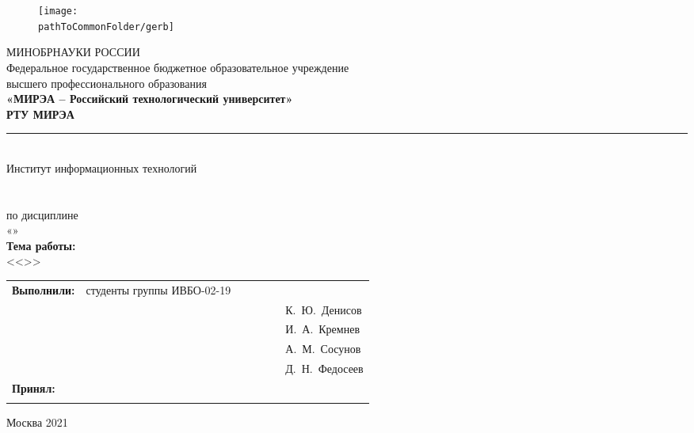 

\renewcommand{\studentfio}{К.~Ю.~Денисов\\
				& & \hfill И.~А.~Кремнев \\
				& & \hfill А.~М.~Сосунов\\
				& & \hfill Д.~Н.~Федосеев}

\begin{center}
	\begin{figure}[h!]
		\begin{center}
			\texttt{[image: \\pathToCommonFolder/gerb]}
		\end{center}	
	\end{figure}
 	\small	МИНОБРНАУКИ РОССИИ \\
Федеральное государственное бюджетное образовательное учреждение\\
высшего профессионального образования\\
	\normalsize					
	\textbf{«МИРЭА – Российский технологический университет»\\
		РТУ МИРЭА}\\
	\noindent\rule{1\linewidth}{1pt}\\
	Институт информационных технологий\\ %
	\kafedra\\
	\vspace{3ex}
	\large \textbf{\workname}  \\
	по дисциплине\\ «\discipline» \\
	\vspace{3ex}
	\if \withouttheme
	\textbf{Тема работы:}\\ <<\theme>>
	\fi
	\vspace{6ex}
	\small
	\begin{table}[h!]
		\begin{tabular}{lp{0.55\linewidth}l}
			\textbf{Выполнили:} & студенты группы ИВБО-02-19 & \\ 
			& & \hfill \studentfio \\%
			\textbf{Принял:} & \rang & \\
			& & \hfill \teacherfio\\
		\end{tabular}
	\end{table}

	\normalsize
	
	\vfill
	Москва 2021
	
\end{center}